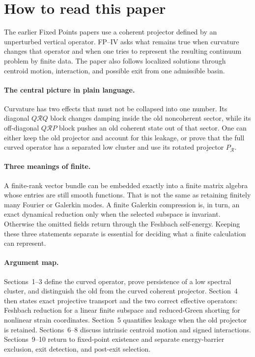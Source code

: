 \documentclass[11pt]{article}
\begin{document}
\section*{How to read this paper}
The earlier Fixed Points papers use a coherent projector defined by an
unperturbed vertical operator.  FP--IV asks what remains true when curvature
changes that operator and when one tries to represent the resulting continuum
problem by finite data.  The paper also follows localized solutions through
centroid motion, interaction, and possible exit from one admissible basin.

\paragraph{The central picture in plain language.}
Curvature has two effects that must not be collapsed into one number.  Its
diagonal $Q\mathcal RQ$ block changes damping inside the old noncoherent
sector, while its off-diagonal $Q\mathcal RP$ block pushes an old coherent
state out of that sector.  One can either keep the old projector and account
for this leakage, or prove that the full curved operator has a separated low
cluster and use its rotated projector $P_{\mathcal R}$.

\paragraph{Three meanings of finite.}
A finite-rank vector bundle can be embedded exactly into a finite matrix
algebra whose entries are still smooth functions.  That is not the same as
retaining finitely many Fourier or Galerkin modes.  A finite Galerkin
compression is, in turn, an exact dynamical reduction only when the selected
subspace is invariant.  Otherwise the omitted fields return through the
Feshbach self-energy.  Keeping these three statements separate is essential
for deciding what a finite calculation can represent.

\paragraph{Argument map.}
Sections~1--3 define the curved operator, prove persistence of a low spectral
cluster, and distinguish the old from the curved coherent projector.
Section~4 then states exact projective transport and the two correct effective
operators: Feshbach reduction for a linear finite subspace and reduced-Green
shorting for nonlinear strain coordinates.  Section~5 quantifies leakage when
the old projector is retained.  Sections~6--8 discuss intrinsic centroid
motion and signed interactions.  Sections~9--10 return to fixed-point
existence and separate energy-barrier exclusion, exit detection, and
post-exit selection.
\end{document}

